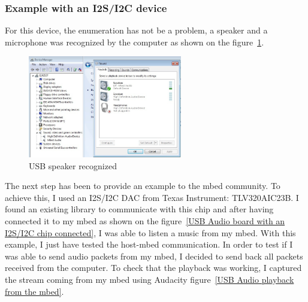 \documentclass[pdftex,10pt,a4paper]{report}
\begin{document}
\subsubsection{Example with an I2S/I2C device}
For this device, the enumeration has not be a problem, a speaker and a microphone was recognized by the computer as shown on the figure~\ref{USB speaker recognized}.

\begin{figure}[h!]
		\centering
		\includegraphics[width=0.6\textwidth]{./mbed_audio.jpg}
		\caption{USB speaker recognized}
		\label{USB speaker recognized}
\end{figure}

The next step has been to provide an example to the mbed community. To achieve this, I used an I2S/I2C DAC from Texas Instrument: TLV320AIC23B. I found an existing library to communicate with this chip and after having connected it to my mbed as shown on the figure~\ref{USB Audio board with an I2S/I2C chip connected}, I was able to listen a music from my mbed. 
With this example, I just have tested the host-mbed communication. In order to test if I was able to send audio packets from my mbed, I decided to send back all packets received from the computer. To check that the playback was working, I captured the stream coming from my mbed using Audacity figure~\ref{USB Audio playback from the mbed}.
\end{document}
